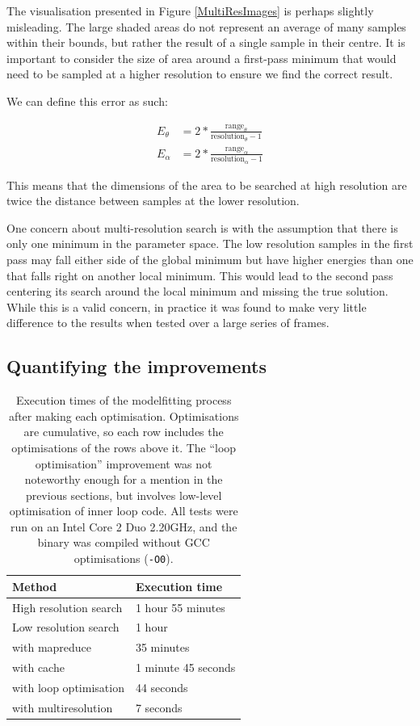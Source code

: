 The visualisation presented in Figure \ref{MultiResImages} is perhaps slightly misleading.
The large shaded areas do not represent an average of many samples within their bounds, but rather the result of a single sample in their centre.
It is important to consider the size of area around a first-pass minimum that would need to be sampled at a higher resolution to ensure we find the correct result.

We can define this error as such:

\begin{align}
	E_\theta &= 2 * \frac{\text{range}_\theta}{\text{resolution}_\theta - 1} \\
	E_\alpha &= 2 * \frac{\text{range}_\alpha}{\text{resolution}_\alpha - 1}
\end{align}

This means that the dimensions of the area to be searched at high resolution are twice the distance between samples at the lower resolution.

One concern about multi-resolution search is with the assumption that there is only one minimum in the parameter space.
The low resolution samples in the first pass may fall either side of the global minimum but have higher energies than one that falls right on another local minimum.
This would lead to the second pass centering its search around the local minimum and missing the true solution.
While this is a valid concern, in practice it was found to make very little difference to the results when tested over a large series of frames.

\subsection{Quantifying the improvements}

\begin{table}[thb]
	\centering
	\begin{tabular}{l|l}
		\hline
		Method & Execution time \\
		\hline
		High resolution search & 1 hour 55 minutes \\
		Low resolution search & 1 hour \\
		with mapreduce & 35 minutes \\
		with cache & 1 minute 45 seconds \\
		with loop optimisation & 44 seconds \\
		with multiresolution & 7 seconds \\
		\hline
	\end{tabular}
	\caption{Execution times of the modelfitting process after making each optimisation.
		Optimisations are cumulative, so each row includes the optimisations of the rows above it.
		The ``loop optimisation'' improvement was not noteworthy enough for a mention in the previous sections,
		but involves low-level optimisation of inner loop code.
		All tests were run on an Intel Core 2 Duo 2.20GHz, and the binary was compiled without GCC optimisations (\texttt{-O0}).}
	\label{QuantifyingOptimisations}
\end{table}

